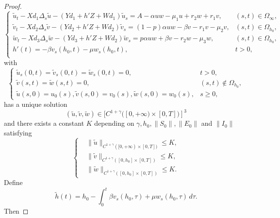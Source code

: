 \documentclass[11pt]{amsart}
\numberwithin{equation}{section}
\theoremstyle{plain}
\theoremstyle{definition}
\begin{document}
\begin{proof}
		\begin{equation*}
			\begin{cases}
				\widetilde{u}_t-Xd_1\Delta_s \widetilde{u}-(Yd_1+h'Z+Wd_1) \widetilde{u}_s=A-\alpha uw-\mu_1u+r_2w+r_1v, &(s,t)\in \Omega_\infty,\\
				\widetilde{v}_t-Xd_2\Delta_s \widetilde{v}-(Yd_2+h'Z+Wd_2)\widetilde{v}_s=(1-p)\alpha uw-\beta v-r_1v-\mu_2v, &(s,t)\in\Omega_{h_0},\\
				\widetilde{w}_t-Xd_3\Delta_s \widetilde{w}-(Yd_3+h'Z+Wd_2)\widetilde{w}_s=p\alpha uw+\beta v-r_2w-\mu_3w, &(s,t)\in\Omega_{h_0},\\
				h'(t)=-\beta v_s(h_0,t)-\mu w_s(h_0,t), &t>0,\\
			\end{cases}
		\end{equation*}
		with
		\begin{equation*}
			\begin{cases}
				\widetilde{u}_s(0,t)=\widetilde{v}_s(0,t)=\widetilde{w}_s(0,t)=0, &t>0, \\
				\widetilde{v}(s,t)=\widetilde{w}(s,t)=0, &(s,t)\notin\Omega_{h_0}, \\
				\widetilde{u}(s,0)=u_0(s), \widetilde{v}(s,0)=v_0(s), \widetilde{w}(s,0)=w_0(s), &s \geq 0,
			\end{cases}
		\end{equation*}
		has a unique solution 
		\begin{equation*}
			(\widetilde u,\widetilde v,\widetilde w) \in [C^{1+\gamma}([0,+\infty) \times [0,T])]^3
		\end{equation*}
		and there exists a constant $K$ depending on $\gamma, h_0, \lVert S_0 \rVert, \lVert E_0 \rVert$ and $\lVert I_0 \rVert$ satisfying
		\begin{equation}	\label{tilda uvw estimates}
			\left \{ \begin{aligned}
				&\lVert \widetilde u \rVert _{{C^{1+\gamma}}([0,+\infty) \times [0,T])} \leq K,\\
				&\lVert \widetilde v \rVert _{{C^{1+\gamma}}([0,h_0] \times [0,T])} \leq K,\\
				&\lVert \widetilde w \rVert _{{C^{1+\gamma}}([0,h_0] \times [0,T])} \leq K.
			\end{aligned} \right.
		\end{equation}
		Define
		\begin{equation*}
			\widetilde h(t)=h_0-\int_0^t\beta v_s(h_0,\tau)+\mu w_s(h_0,\tau) \, d\tau.
		\end{equation*}
		Then

\end{proof}
\end{document}
